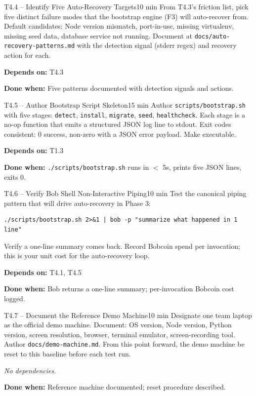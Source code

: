 \documentclass[11pt,letterpaper]{article}
\newcommand{\acceptance}[1]{\par\smallskip\textcolor{ibmgreen}{\textbf{Done when:}} #1}
\newcommand{\depends}[1]{\par\smallskip\textcolor{ibmorange}{\textbf{Depends on:}} #1}
\newcommand{\nodep}{\par\smallskip\textcolor{ibmgray}{\textit{No dependencies.}}}
\begin{document}
\begin{task}{T4.4 -- Identify Five Auto-Recovery Targets}{10 min}
From T4.3's friction list, pick five distinct failure modes that the bootstrap engine (F3) will auto-recover from. Default candidates: Node version mismatch, port-in-use, missing virtualenv, missing seed data, database service not running. Document at \texttt{docs/auto-recovery-patterns.md} with the detection signal (stderr regex) and recovery action for each.
\depends{T4.3}
\acceptance{Five patterns documented with detection signals and actions.}
\end{task}

\begin{task}{T4.5 -- Author Bootstrap Script Skeleton}{15 min}
Author \texttt{scripts/bootstrap.sh} with five stages: \texttt{detect}, \texttt{install}, \texttt{migrate}, \texttt{seed}, \texttt{healthcheck}. Each stage is a no-op function that emits a structured JSON log line to stdout. Exit codes consistent: 0 success, non-zero with a JSON error payload. Make executable.
\depends{T1.3}
\acceptance{\texttt{./scripts/bootstrap.sh} runs in $<$ 5s, prints five JSON lines, exits 0.}
\end{task}

\begin{task}{T4.6 -- Verify Bob Shell Non-Interactive Piping}{10 min}
Test the canonical piping pattern that will drive auto-recovery in Phase 3:

\begin{lstlisting}
./scripts/bootstrap.sh 2>&1 | bob -p "summarize what happened in 1 line"
\end{lstlisting}

Verify a one-line summary comes back. Record Bobcoin spend per invocation; this is your unit cost for the auto-recovery loop.
\depends{T4.1, T4.5}
\acceptance{Bob returns a one-line summary; per-invocation Bobcoin cost logged.}
\end{task}

\begin{task}{T4.7 -- Document the Reference Demo Machine}{10 min}
Designate one team laptop as the official demo machine. Document: OS version, Node version, Python version, screen resolution, browser, terminal emulator, screen-recording tool. Author \texttt{docs/demo-machine.md}. From this point forward, the demo machine \shall{} be reset to this baseline before each test run.
\nodep
\acceptance{Reference machine documented; reset procedure described.}
\end{task}
\end{document}
